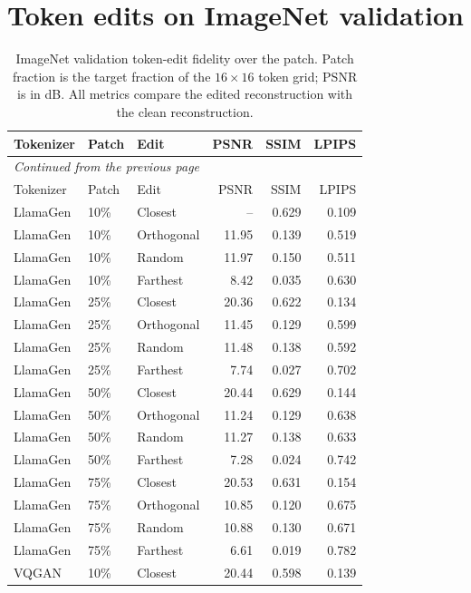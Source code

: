 \section{Token edits on ImageNet validation}

\begingroup
\small
\setlength{\tabcolsep}{4pt}
\begin{longtable}{lllrrr}
\caption[ImageNet validation token-edit fidelity over the patch]{ImageNet validation token-edit fidelity over the patch. Patch fraction is the target fraction of the $16\times16$ token grid; PSNR is in dB. All metrics compare the edited reconstruction with the clean reconstruction.}\label{tab:app_imagenet_val_patch_fidelity}\\
\hline
Tokenizer & Patch & Edit & PSNR & SSIM & LPIPS \\ \hline
\endfirsthead
\multicolumn{6}{l}{\small\itshape Continued from the previous page}\\
\hline
Tokenizer & Patch & Edit & PSNR & SSIM & LPIPS \\ \hline
\endhead
\hline
\endfoot
LlamaGen & 10\% & Closest & -- & 0.629 & 0.109 \\
LlamaGen & 10\% & Orthogonal & 11.95 & 0.139 & 0.519 \\
LlamaGen & 10\% & Random & 11.97 & 0.150 & 0.511 \\
LlamaGen & 10\% & Farthest & 8.42 & 0.035 & 0.630 \\
LlamaGen & 25\% & Closest & 20.36 & 0.622 & 0.134 \\
LlamaGen & 25\% & Orthogonal & 11.45 & 0.129 & 0.599 \\
LlamaGen & 25\% & Random & 11.48 & 0.138 & 0.592 \\
LlamaGen & 25\% & Farthest & 7.74 & 0.027 & 0.702 \\
LlamaGen & 50\% & Closest & 20.44 & 0.629 & 0.144 \\
LlamaGen & 50\% & Orthogonal & 11.24 & 0.129 & 0.638 \\
LlamaGen & 50\% & Random & 11.27 & 0.138 & 0.633 \\
LlamaGen & 50\% & Farthest & 7.28 & 0.024 & 0.742 \\
LlamaGen & 75\% & Closest & 20.53 & 0.631 & 0.154 \\
LlamaGen & 75\% & Orthogonal & 10.85 & 0.120 & 0.675 \\
LlamaGen & 75\% & Random & 10.88 & 0.130 & 0.671 \\
LlamaGen & 75\% & Farthest & 6.61 & 0.019 & 0.782 \\
VQGAN & 10\% & Closest & 20.44 & 0.598 & 0.139 \\

\end{longtable}
